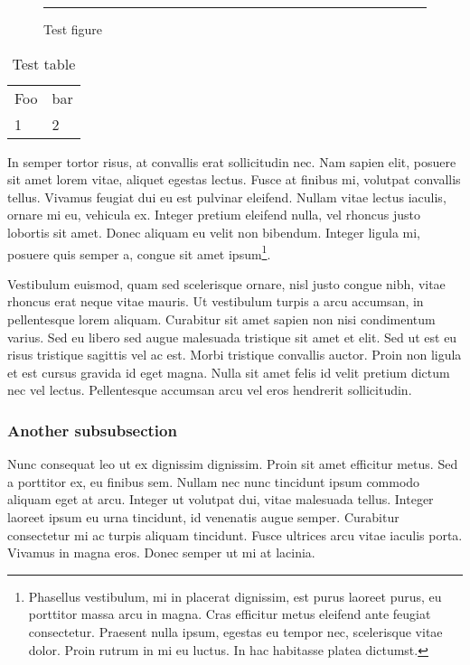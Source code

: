 \documentclass{abe}
\begin{document}
\begin{figure}[htbp]
\rule{2cm}{2cm}
\caption{Test figure}
\label{fig:test}
\end{figure}

\begin{table}[htbp]
\caption{Test table}
\label{table:test}
\begin{tabular}{ll}
Foo & bar \\
1 & 2 \\
\end{tabular}
\end{table}

In semper tortor risus, at convallis erat sollicitudin nec. Nam sapien elit, posuere sit amet lorem vitae, aliquet egestas lectus. Fusce at finibus mi, volutpat convallis tellus. Vivamus feugiat dui eu est pulvinar eleifend. Nullam vitae lectus iaculis, ornare mi eu, vehicula ex. Integer pretium eleifend nulla, vel rhoncus justo lobortis sit amet. Donec aliquam eu velit non bibendum. Integer ligula mi, posuere quis semper a, congue sit amet ipsum\footnote{Phasellus vestibulum, mi in placerat dignissim, est purus laoreet purus, eu porttitor massa arcu in magna. Cras efficitur metus eleifend ante feugiat consectetur. Praesent nulla ipsum, egestas eu tempor nec, scelerisque vitae dolor. Proin rutrum in mi eu luctus. In hac habitasse platea dictumst.}.

Vestibulum euismod, quam sed scelerisque ornare, nisl justo congue nibh, vitae rhoncus erat neque vitae mauris. Ut vestibulum turpis a arcu accumsan, in pellentesque lorem aliquam. Curabitur sit amet sapien non nisi condimentum varius. Sed eu libero sed augue malesuada tristique sit amet et elit. Sed ut est eu risus tristique sagittis vel ac est. Morbi tristique convallis auctor. Proin non ligula et est cursus gravida id eget magna. Nulla sit amet felis id velit pretium dictum nec vel lectus. Pellentesque accumsan arcu vel eros hendrerit sollicitudin. 

\subsubsection{Another subsubsection}
Nunc consequat leo ut ex dignissim dignissim. Proin sit amet efficitur metus. Sed a porttitor ex, eu finibus sem. Nullam nec nunc tincidunt ipsum commodo aliquam eget at arcu. Integer ut volutpat dui, vitae malesuada tellus. Integer laoreet ipsum eu urna tincidunt, id venenatis augue semper. Curabitur consectetur mi ac turpis aliquam tincidunt. Fusce ultrices arcu vitae iaculis porta. Vivamus in magna eros. Donec semper ut mi at lacinia.
\end{document}
